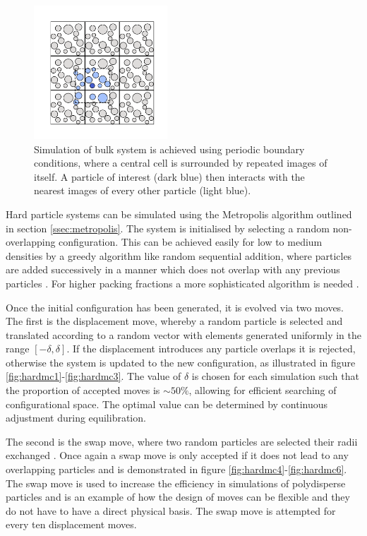 \begin{figure}[bt]
	\vspace{1cm}
	\includegraphics[width=5cm]{./figures/methods/mc_move_g.pdf}
	\caption{Simulation of bulk system is achieved using periodic boundary conditions, where a central cell is surrounded by repeated images of itself. A particle of interest (dark blue) then interacts with the nearest images of every other particle (light blue).}
	\label{fig:pbc}     
\end{figure}

Hard particle systems can be simulated using the Metropolis algorithm outlined in section \ref{ssec:metropolis}.
The system is initialised by selecting a random non\--overlapping configuration.
This can be achieved easily for low to medium densities by a greedy algorithm like random sequential addition, where particles are added successively in a manner which does not overlap with any previous particles \cite{Widom1966}.
For higher packing fractions a more sophisticated algorithm is needed .

Once the initial configuration has been generated, it is evolved via two \mc{} moves.
The first is the displacement move, whereby a random particle is selected and translated according to a random vector with elements generated uniformly in the range $\left[-\delta,\delta\right]$.
If the displacement introduces any particle overlaps it is rejected, otherwise the system is updated to the new configuration, as illustrated in figure \ref{fig:hardmc1}\--\ref{fig:hardmc3}.
The value of $\delta$ is chosen for each simulation such that the proportion of accepted moves is $\sim 50\%$, allowing for efficient searching of configurational space.
The optimal value can be determined by continuous adjustment during equilibration.

The second is the swap move, where two random particles are selected their radii exchanged \cite{Grigera2001,Ninarello2017}. 
Once again a swap move is only accepted if it does not lead to any overlapping particles and is demonstrated in figure \ref{fig:hardmc4}\--\ref{fig:hardmc6}.
The swap move is used to increase the efficiency in simulations of polydisperse particles and is an example of how the design of \mc{} moves can be flexible and they do not have to have a direct physical basis. 
The swap move is attempted for every ten displacement moves. 

